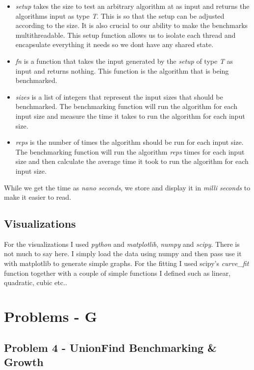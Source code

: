 \documentclass[12pt]{article}
\begin{document}
\begin{itemize}
    \item \emph{setup} takes the size to test an arbitrary algorithm at as input and returns the algorithms input as type \emph{T}. This is so that the setup can be adjusted according to the size. It is also crucial to our ability to make the benchmarks multithreadable. This setup function allows us to isolate each thread and encapsulate everything it needs so we dont have any shared state.
    \item \emph{fn} is a function that takes the input generated by the \emph{setup} of type \emph{T} as input and returns nothing. This function is the algorithm that is being benchmarked.
    \item \emph{sizes} is a list of integers that represent the input sizes that should be benchmarked. The benchmarking function will run the algorithm for each input size and measure the time it takes to run the algorithm for each input size.
    \item \emph{reps} is the number of times the algorithm should be run for each input size. The benchmarking function will run the algorithm \emph{reps} times for each input size and then calculate the average time it took to run the algorithm for each input size.
\end{itemize}

While we get the time as \emph{nano seconds}, we store and display it in \emph{milli seconds} to make it easier to read.

\subsection{Visualizations}

For the visualizations I used \emph{python} and \emph{matplotlib}, \emph{numpy} and \emph{scipy}. There is not much to say here.
I simply load the data using numpy and then pass use it with matplotlib to generate simple graphs. For the fitting I used scipy's \emph{curve\_fit} function
together with a couple of simple functions I defined such as linear, quadratic, cubic etc..

\section{Problems - G}


\subsection{Problem 4 - UnionFind Benchmarking \& Growth}
\end{document}
